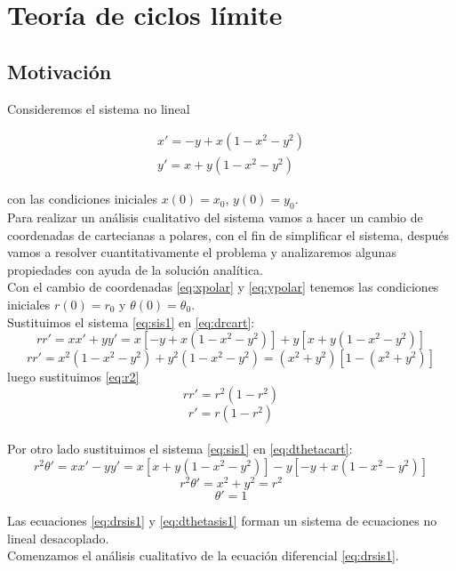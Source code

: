 \documentclass[12pt, a4paper]{report}
\begin{document}
\chapter{Teoría de ciclos límite}
\section{Motivación}

Consideremos el sistema no lineal

\begin{equation}\label{eq:sis1}
	\begin{matrix}
		x'=-y+x(1-x^2-y^2) \\
		y'=x+y(1-x^2-y^2)
	\end{matrix}
\end{equation}

con las condiciones iniciales $x(0)=x_0$, $y(0)=y_0$.\\

Para realizar un análisis cualitativo del sistema vamos a hacer un cambio
de coordenadas de cartecianas a polares, con el fin de simplificar
el sistema, después vamos a resolver cuantitativamente el  problema y
analizaremos algunas propiedades con ayuda de la solución analítica.\\

Con el cambio de coordenadas \eqref{eq:xpolar} y  \eqref{eq:ypolar} tenemos
las condiciones iniciales $r(0)=r_0$ y $\theta(0)=\theta_0$.\\

Sustituimos el sistema \eqref{eq:sis1} en \eqref{eq:drcart}:
$$rr'=xx'+yy'=x[-y+x(1-x^2-y^2)]+y[x+y(1-x^2-y^2)]$$
$$rr'=x^2(1-x^2-y^2)+y^2(1-x^2-y^2)=(x^2+y^2)[1-(x^2+y^2)]$$
luego sustituimos \eqref{eq:r2}
$$rr'=r^2(1-r^2)$$
\begin{equation}\label{eq:drsis1}
	r'=r(1-r^2)
\end{equation}\\

Por otro lado sustituimos el sistema \eqref{eq:sis1} en \eqref{eq:dthetacart}:
$$r^2\theta'=xx'-yy'=x[x+y(1-x^2-y^2)]-y[-y+x(1-x^2-y^2)]$$
$$r^2\theta'=x^2+y^2=r^2$$
\begin{equation}\label{eq:dthetasis1}
	\theta'=1
\end{equation}

Las ecuaciones \eqref{eq:drsis1} y \eqref{eq:dthetasis1}
forman un sistema de ecuaciones no lineal desacoplado.\\

Comenzamos el análisis cualitativo de la ecuación diferencial \eqref{eq:drsis1}.\\
\end{document}
